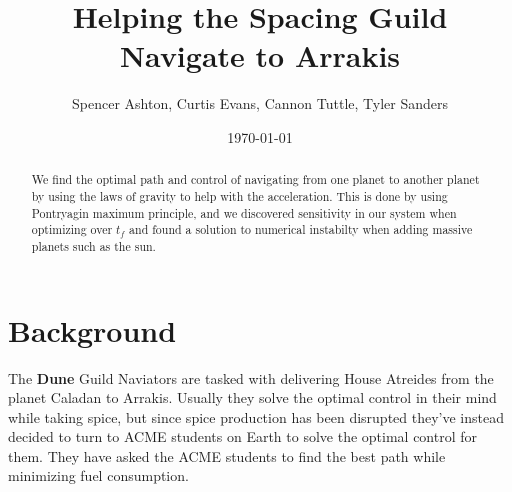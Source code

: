 \documentclass[11pt]{amsart}
\begin{document}
\title{Helping the Spacing Guild Navigate to Arrakis}
\author{Spencer Ashton, Curtis Evans, Cannon Tuttle, Tyler Sanders}

\date{\today}

\begin{abstract}
    We find the optimal path and control of navigating from one planet to another planet by using the laws of gravity to help with 
    the acceleration. This is done by using Pontryagin maximum principle, and we discovered sensitivity in our system when optimizing over $t_f$ and found a solution to numerical instabilty when 
    adding massive planets such as the sun. 
\end{abstract}

\maketitle

\section{Background}
The \textbf{Dune} Guild Naviators are tasked with delivering House Atreides from the planet Caladan to Arrakis. Usually they solve the optimal control in their mind while taking spice, but since spice production
has been disrupted they've instead decided to turn to ACME students on Earth to solve the optimal control for them. They have asked the ACME students to find the best path while minimizing fuel consumption. 
\end{document}
